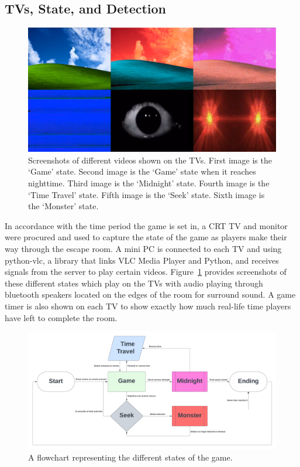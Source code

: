 \documentclass[conference]{IEEEtran}
\begin{document}
\subsection{TVs, State, and Detection} %

\begin{figure}[ht]
    \centering
    \includegraphics[width=0.90\columnwidth]{Images/TV_States.png}
    \caption{Screenshots of different videos shown on the TVs. First image is the `Game' state.
    Second image is the `Game' state when it reaches nighttime. Third image is the `Midnight' state. 
    Fourth image is the `Time Travel' state. Fifth image is the `Seek' state. Sixth image is the `Monster' state.}
    \label{fig:tv}
\end{figure}

\indent In accordance with the time period the game is set in, a CRT TV and monitor were procured and used to capture the state of the game
as players make their way through the escape room. A mini PC is connected to each TV and using python-vlc, a library that links VLC Media Player
and Python, and receives signals from the server to play certain videos. Figure~\ref{fig:tv} provides screenshots of these different states
which play on the TVs with audio playing through bluetooth speakers located on the edges of the room for surround sound. A game timer is also shown
on each TV to show exactly how much real-life time players have left to complete the room.

\begin{figure}[ht]
    \centering
    \includegraphics[width=0.90\columnwidth]{Images/state_flow.png}
    \caption{A flowchart representing the different states of the game.}
    \label{fig:pir}
\end{figure}
\end{document}

